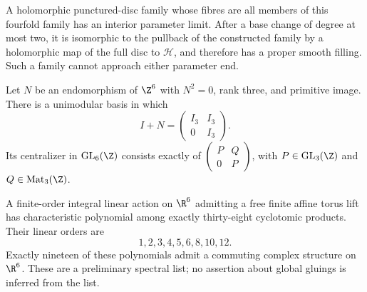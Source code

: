 \begin{theorem}\label{night:P1A.6}
A holomorphic punctured-disc family whose fibres are all
members of this fourfold family has an interior parameter
limit. After a base change of degree at most two, it is
isomorphic to the pullback of the constructed family by
a holomorphic map of the full disc to $\mathcal H$, and
therefore has a proper smooth filling. Such a family
cannot approach either parameter end.
\end{theorem}

\begin{theorem}\label{night:P1B.1}
Let $N$ be an endomorphism of $\Z^6$ with $N^2=0$, rank three,
and primitive image. There is a unimodular basis in which
\[
 I+N=\begin{pmatrix}I_3&I_3\\0&I_3\end{pmatrix}.
\]
Its centralizer in $\operatorname{GL}_6(\Z)$ consists exactly of
$\left(\begin{smallmatrix}P&Q\\0&P\end{smallmatrix}\right)$,
with $P\in\operatorname{GL}_3(\Z)$ and $Q\in\operatorname{Mat}_3(\Z)$.
\end{theorem}

\begin{theorem}\label{night:P1B.2}
A finite-order integral linear action on $\R^6$ admitting a
free finite affine torus lift has characteristic polynomial
among exactly thirty-eight cyclotomic products. Their linear
orders are
\[
 1,2,3,4,5,6,8,10,12.
\]
Exactly nineteen of these polynomials admit a commuting complex
structure on $\R^6$. These are a preliminary spectral list;
no assertion about global gluings is inferred from the list.
\end{theorem}